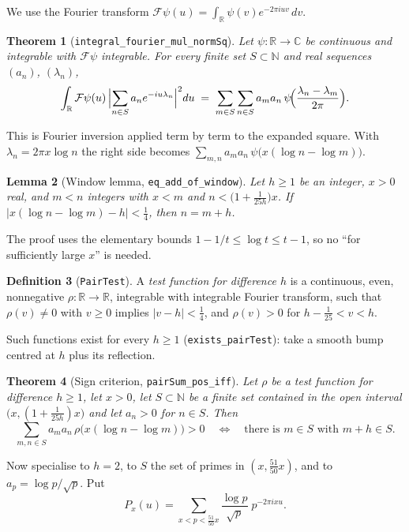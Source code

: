 \documentclass[11pt]{article}
\newtheorem{theorem}{Theorem}
\newtheorem{lemma}[theorem]{Lemma}
\theoremstyle{definition}
\newtheorem{definition}[theorem]{Definition}
\theoremstyle{remark}
\newcommand{\R}{\mathbb{R}}
\newcommand{\N}{\mathbb{N}}
\newcommand{\F}{\mathcal{F}}
\newcommand{\lean}[1]{\texttt{#1}}
\begin{document}
We use the Fourier transform $\F\psi(u)=\int_\R \psi(v)e^{-2\pi i uv}\,dv$.

\begin{theorem}[\lean{integral\_fourier\_mul\_normSq}]\label{thm:identity}
Let $\psi:\R\to\mathbb{C}$ be continuous and integrable with $\F\psi$ integrable.
For every finite set $S\subset\N$ and real sequences $(a_n)$, $(\lambda_n)$,
\[
\int_\R \F\psi(u)\,\Bigl|\sum_{n\in S} a_n e^{-iu\lambda_n}\Bigr|^2 du
 \;=\; \sum_{m\in S}\sum_{n\in S} a_m a_n\,\psi\!\Bigl(\frac{\lambda_n-\lambda_m}{2\pi}\Bigr).
\]
\end{theorem}

This is Fourier inversion applied term by term to the expanded square. With
$\lambda_n = 2\pi x\log n$ the right side becomes
$\sum_{m,n} a_m a_n\,\psi\bigl(x(\log n-\log m)\bigr)$.

\begin{lemma}[Window lemma, \lean{eq\_add\_of\_window}]\label{lem:window}
Let $h\ge 1$ be an integer, $x>0$ real, and $m<n$ integers with
$x<m$ and $n<\bigl(1+\tfrac{1}{25h}\bigr)x$. If
$\bigl|x(\log n-\log m)-h\bigr|<\tfrac14$, then $n=m+h$.
\end{lemma}

The proof uses the elementary bounds $1-1/t\le\log t\le t-1$, so no ``for
sufficiently large $x$'' is needed.

\begin{definition}[\lean{PairTest}]
A \emph{test function for difference $h$} is a continuous, even, nonnegative
$\rho:\R\to\R$, integrable with integrable Fourier transform, such that
$\rho(v)\neq0$ with $v\ge0$ implies $|v-h|<\tfrac14$, and $\rho(v)>0$ for
$h-\tfrac1{25}<v<h$.
\end{definition}

Such functions exist for every $h\ge1$ (\lean{exists\_pairTest}): take a smooth
bump centred at $h$ plus its reflection.

\begin{theorem}[Sign criterion, \lean{pairSum\_pos\_iff}]\label{thm:sign}
Let $\rho$ be a test function for difference $h\ge1$, let $x>0$, let
$S\subset\N$ be a finite set contained in the open interval
$\bigl(x,(1+\tfrac1{25h})x\bigr)$ and let $a_n>0$ for $n\in S$. Then
\[
\sum_{m,n\in S} a_m a_n\,\rho\bigl(x(\log n-\log m)\bigr)>0
\quad\Longleftrightarrow\quad
\text{there is } m\in S \text{ with } m+h\in S .
\]
\end{theorem}

Now specialise to $h=2$, to $S$ the set of primes in $(x,\tfrac{51}{50}x)$, and to
$a_p=\log p/\sqrt p$. Put
\[
P_x(u)=\sum_{x<p<\frac{51}{50}x}\frac{\log p}{\sqrt p}\;p^{-2\pi i x u}.
\]
\end{document}
